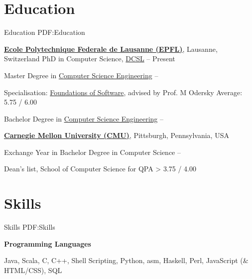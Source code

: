 \documentclass[a4paper,10pt,oneside]{article}
\begin{document}
\begin{body}


\section
{Education}
{Education}
{PDF:Education}

\href{https://www.epfl.ch/}
{\textbf{Ecole Polytechnique Federale de Lausanne (EPFL)}},
Lausanne, Switzerland
\SmallEntryGap
PhD in Computer Science, \href{http://dcsl.epfl.ch/}{DCSL}
\hfill
{} --
Present

\SmallEntryGap
Master Degree in
\href{http://ic.epfl.ch/computer-science/master}
{Computer Science Engineering}
\hfill
{} --
\begin{detail}
\BulletItem
Specialisation:
\href{http://ic.epfl.ch/specializations}
{Foundations of Software}, advised by Prof. M Odersky
\BulletItem
Average:
5.75 / 6.00
\end{detail}

\SmallEntryGap
Bachelor Degree in
\href{http://ic.epfl.ch/computer-science/bachelor}
{Computer Science Engineering}
\hfill
{} --

\EntryGap
\href{http://www.cmu.edu/}
{\textbf{Carnegie Mellon University (CMU)}},
Pittsburgh, Pennsylvania, USA
\par
Exchange Year in Bachelor Degree in Computer Science
\hfill
{} --
\begin{detail}
\BulletItem
Dean's list, School of Computer Science for QPA > 3.75 / 4.00
\end{detail}

\hline


\section
{Skills}
{Skills}
{PDF:Skills}

\textbf{Programming Languages}
\par
\begin{skilling}
Java, 
Scala,
C, 
C++, 
Shell Scripting,
Python, 
asm,
Haskell,
Perl,
JavaScript (\& HTML/CSS),
SQL
\end{skilling}


\end{body}
\end{document}
